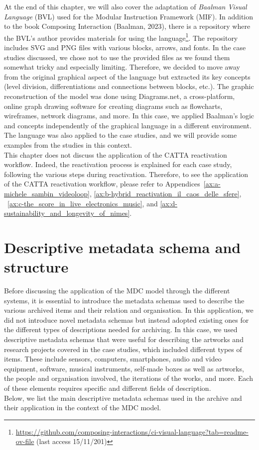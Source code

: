 At the end of this chapter, we will also cover the adaptation of \textit{Baalman Visual Language} (BVL) used for the Modular Instruction Framework (MIF). In addition to the book Composing Interaction (Baalman, 2023), there is a repository where the BVL's author provides materials for using the language\footnote{\url{https://github.com/composing-interactions/ci-visual-language?tab=readme-ov-file} (last access 15/11/201)}. The repository includes SVG and PNG files with various blocks, arrows, and fonts. In the case studies discussed, we chose not to use the provided files as we found them somewhat tricky and especially limiting. Therefore, we decided to move away from the original graphical aspect of the language but extracted its key concepts (level division, differentiations and connections between blocks, etc.). The graphic reconstruction of the model was done using Diagrams.net, a cross-platform, online graph drawing software for creating diagrams such as flowcharts, wireframes, network diagrams, and more. In this case, we applied Baalman’s logic and concepts independently of the graphical language in a different environment.\\
The language was also applied to the case studies, and we will provide some examples from the studies in this context.\\
This chapter does not discuss the application of the CATTA reactivation workflow. Indeed, the reactivation process is explained for each case study, following the various steps during reactivation. Therefore, to see the application of the CATTA reactivation workflow, please refer to Appendices~\ref{ax:a-michele_sambin_videoloop}, \ref{ax:b-hybrid_reactivation_il_caos_delle_sfere}, ~\ref{ax:c-the_score_in_live_electronics_music}, and \ref{ax:d-sustainability_and_longevity_of_nimes}.

\section{Descriptive metadata schema and structure}
Before discussing the application of the MDC model through the different systems, it is essential to introduce the metadata schemas used to describe the various archived items and their relation and organisation. In this application, we did not introduce novel metadata schemas but instead adopted existing ones for the different types of descriptions needed for archiving. In this case, we used descriptive metadata schemas that were useful for describing the artworks and research projects covered in the case studies, which included different types of items. These include sensors, computers, smartphones, audio and video equipment, software, musical instruments, self-made boxes as well as artworks, the people and organisation involved, the iterations of the works, and more. Each of these elements requires specific and different fields of description.\\
Below, we list the main descriptive metadata schemas used in the archive and their application in the context of the MDC model.


